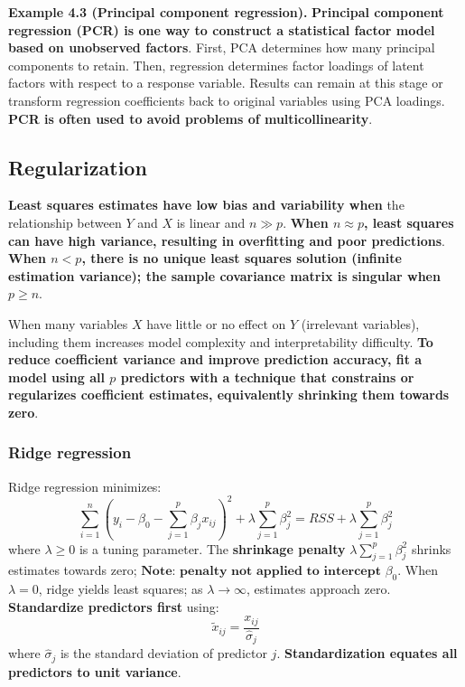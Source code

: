 \documentclass[12pt,a4paper]{article}
\begin{document}
\vspace{0.5em}

\textbf{Example 4.3 (Principal component regression).} \textbf{Principal component regression (PCR) is one way to construct a statistical factor model based on unobserved factors}. First, PCA determines how many principal components to retain. Then, regression determines factor loadings of latent factors with respect to a response variable. Results can remain at this stage or transform regression coefficients back to original variables using PCA loadings. \textbf{PCR is often used to avoid problems of multicollinearity}.

\subsection{Regularization}

\textbf{Least squares estimates have low bias and variability when} the relationship between $Y$ and $X$ is linear and $n \gg p$. \textbf{When $n \approx p$, least squares can have high variance, resulting in overfitting and poor predictions}. \textbf{When $n < p$, there is no unique least squares solution (infinite estimation variance); the sample covariance matrix is singular when $p \geq n$}.

When many variables $X$ have little or no effect on $Y$ (irrelevant variables), including them increases model complexity and interpretability difficulty. \textbf{To reduce coefficient variance and improve prediction accuracy, fit a model using all $p$ predictors with a technique that constrains or regularizes coefficient estimates, equivalently shrinking them towards zero}.

\subsubsection{Ridge regression}

Ridge regression minimizes:
\[
\sum_{i=1}^{n}\left(y_i - \beta_0 - \sum_{j=1}^{p}\beta_j x_{ij}\right)^2 + \lambda \sum_{j=1}^{p}\beta_j^2 = RSS + \lambda \sum_{j=1}^{p}\beta_j^2
\]
where $\lambda \geq 0$ is a tuning parameter. The \textbf{shrinkage penalty} $\lambda \sum_{j=1}^{p}\beta_j^2$ shrinks estimates towards zero; $\textbf{Note: penalty not applied to intercept}$ $\beta_0$. When $\lambda = 0$, ridge yields least squares; as $\lambda \to \infty$, estimates approach zero. \textbf{Standardize predictors first} using:
\[
\tilde{x}_{ij} = \frac{x_{ij}}{\hat{\sigma}_j}
\]
where $\hat{\sigma}_j$ is the standard deviation of predictor $j$. \textbf{Standardization equates all predictors to unit variance}.
\end{document}
